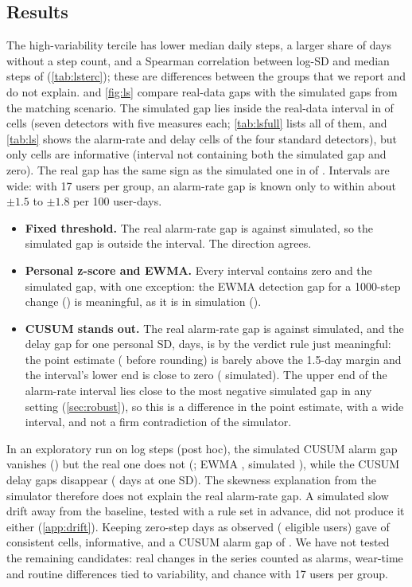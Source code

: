 \documentclass[11pt,a4paper]{article}
\begin{document}
\subsection{Results}
The high-variability tercile has lower median daily steps, a larger share of days without a step count, and a Spearman correlation between log-SD and median steps of \LsSpearman{} (\cref{tab:lsterc}); these are differences between the groups that we report and do not explain.
 and \cref{fig:ls} compare real-data gaps with the simulated gaps from the matching scenario. The simulated gap lies inside the real-data interval in \LsConsistent{} of \LsCells{} cells (seven detectors with five measures each; \cref{tab:lsfull} lists all of them, and \cref{tab:ls} shows the alarm-rate and delay cells of the four standard detectors), but only \LsInformative{} cells are informative (interval not containing both the simulated gap and zero). The real gap has the same sign as the simulated one in \LsSameSign{} of \LsCells. Intervals are wide: with 17 users per group, an alarm-rate gap is known only to within about $\pm1.5$ to $\pm1.8$ per 100 user-days.
\begin{itemize}
  \item \textbf{Fixed threshold.} The real alarm-rate gap is \LsFixedAlarmCI{} against \LsFixedAlarmSim{} simulated, so the simulated gap is outside the interval. The direction agrees.
  \item \textbf{Personal z-score and EWMA.} Every interval contains zero and the simulated gap, with one exception: the EWMA detection gap for a 1000-step change (\LsEwmaDetAbsCI) is meaningful, as it is in simulation (\LsEwmaDetAbsSim).
  \item \textbf{CUSUM stands out.} The real alarm-rate gap is \LsCusumAlarmCI{} against \LsCusumAlarmSim{} simulated, and the delay gap for one personal SD, \LsCusumRmdStdCI{} days, is by the verdict rule just meaningful: the point estimate (\LsCusumRmdStdExact{} before rounding) is barely above the 1.5-day margin and the interval's lower end is close to zero (\LsCusumRmdStdSim{} simulated). The upper end of the alarm-rate interval lies close to the most negative simulated gap in any setting (\cref{sec:robust}), so this is a difference in the point estimate, with a wide interval, and not a firm contradiction of the simulator.
\end{itemize}
In an exploratory run on log steps (post hoc), the simulated CUSUM alarm gap vanishes (\LsLogCusumAlarmSim{}) but the real one does not (\LsLogCusumAlarmCI{}; EWMA \LsLogEwmaAlarmCI{}, simulated \LsLogEwmaAlarmSim), while the CUSUM delay gaps disappear (\LsLogCusumRmdStdCI{} days at one SD). The skewness explanation from the simulator therefore does not explain the real alarm-rate gap. A simulated slow drift away from the baseline, tested with a rule set in advance, did not produce it either (\cref{app:drift}). Keeping zero-step days as observed (\LsZeroEligible{} eligible users) gave \LsZeroConsistent{} of \LsZeroCells{} consistent cells, \LsZeroInformative{} informative, and a CUSUM alarm gap of \LsZeroCusumAlarmCI.
We have not tested the remaining candidates: real changes in the series counted as alarms, wear-time and routine differences tied to variability, and chance with 17 users per group.
\end{document}
